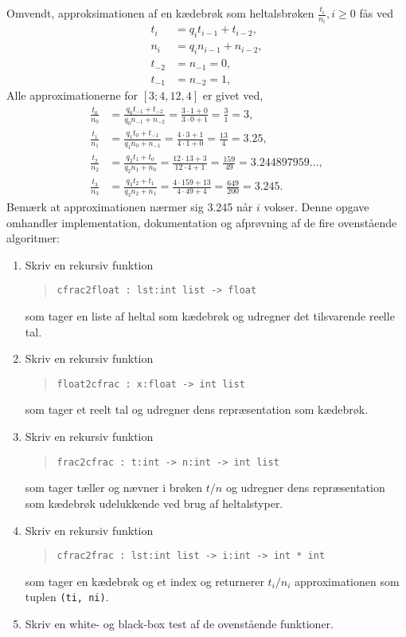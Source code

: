 \documentclass[a4paper,12pt]{article}
\begin{document}
Omvendt, approksimationen af en kædebrøk som heltalsbrøken $\frac{t_i}{n_i}, i \geq 0$ fås ved
\begin{align}
  t_i &= q_it_{i-1}+t_{i-2},
  \\n_i &= q_in_{i-1}+n_{i-2},
  \\t_{-2} &= n_{-1} = 0,
  \\t_{-1} &= n_{-2} =1,
\end{align}
Alle approximationerne for $[3; 4, 12, 4]$ er givet ved,
\begin{align}
  \frac{t_0}{n_0} &= \frac{q_0t_{-1} + t_{-2}}{q_0n_{-1}+n_{-2}} = \frac{3\cdot 1+0}{3\cdot 0 + 1} = \frac{3}{1} = 3,
  \\\frac{t_1}{n_1} &= \frac{q_1t_0 + t_{-1}}{q_1n_0+n_{-1}} = \frac{4\cdot 3 + 1}{4\cdot 1+0} = \frac{13}{4} = 3.25,
  \\\frac{t_2}{n_2} &= \frac{q_2t_1 + t_{0}}{q_2n_1+n_{0}} = \frac{12\cdot 13 + 3}{12\cdot 4 + 1} = \frac{159}{49} = 3.244897959\ldots,
  \\\frac{t_3}{n_3} &= \frac{q_3t_2 + t_{1}}{q_3n_2+n_{1}} = \frac{4\cdot 159 + 13}{4\cdot 49+4} = \frac{649}{200} = 3.245.
\end{align}
Bemærk at approximationen nærmer sig 3.245 når $i$ vokser.
\newpage
Denne opgave omhandler implementation, dokumentation og afprøvning af de fire ovenstående algoritmer:
\begin{enumerate}[label=6g.\arabic*,start=0]
\item Skriv en rekursiv funktion
  \begin{quote}
    \lstinline{cfrac2float : lst:int list -> float}
  \end{quote}
  som tager en liste af heltal som kædebrøk og udregner det tilsvarende reelle tal.
\item Skriv en rekursiv funktion
  \begin{quote}
    \lstinline{float2cfrac : x:float -> int list}
  \end{quote}
  som tager et reelt tal og udregner dens repræsentation som kædebrøk.
\item Skriv en rekursiv funktion
  \begin{quote}
    \lstinline{frac2cfrac : t:int -> n:int -> int list}
  \end{quote}
  som tager tæller og nævner i brøken $t/n$ og udregner dens repræsentation som kædebrøk udelukkende ved brug af heltalstyper.
\item Skriv en rekursiv funktion
  \begin{quote}
    \lstinline{cfrac2frac : lst:int list -> i:int -> int * int}
  \end{quote}
  som tager en kædebrøk og et index og returnerer $t_i/n_i$ approximationen som tuplen \lstinline{(ti, ni)}.
\item Skriv en white- og black-box test af de ovenstående funktioner.
\end{enumerate}
\end{document}
